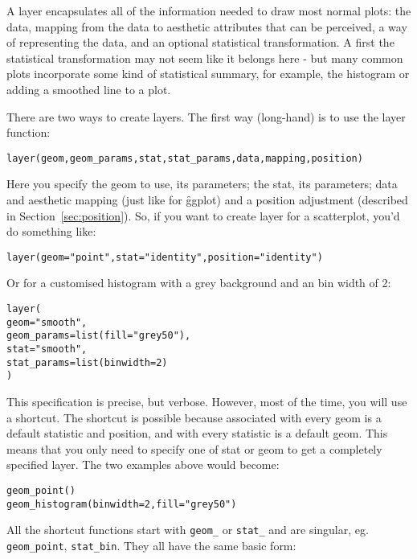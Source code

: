 A layer encapsulates all of the information needed to draw most normal plots:  the data, mapping from the data to aesthetic attributes that can be perceived, a way of representing the data, and an optional statistical transformation.  A first the statistical transformation may not seem like it belongs here - but many common plots incorporate some kind of statistical summary, for example, the histogram or adding a smoothed line to a plot.  

There are two ways to create layers.  The first way (long-hand) is to use the layer function:

\begin{alltt}
  layer(geom, geom_params, stat, stat_params, data, mapping, position)
\end{alltt}

\noindent Here you specify the geom to use, its parameters; the stat, its parameters; data and aesthetic mapping (just like for \f{ggplot}) and a position adjustment (described in Section~\ref{sec:position}).  So, if you want to create layer for a scatterplot, you'd do something like:

\begin{alltt}
layer(geom = "point", stat = "identity", position = "identity")  
\end{alltt}

\noindent Or for a customised histogram with a grey background and an bin width of 2:

\begin{alltt}
layer(
  geom = "smooth", 
  geom_params = list(fill = "grey50"),
  stat = "smooth",
  stat_params = list(binwidth = 2)
)
\end{alltt}

\noindent  This specification is precise, but verbose.  However, most of the time, you will use a shortcut.  The shortcut is possible because associated with every geom is a default statistic and position, and with every statistic is a default geom.  This means that you only need to specify one of stat or geom to get a completely specified layer.  The two examples above would become:

\begin{alltt}
geom_point()
geom_histogram(binwidth = 2, fill = "grey50")
\end{alltt}

All the shortcut functions start with {\tt geom\_} or {\tt stat\_} and are singular, eg. {\tt geom\_point}, {\tt stat\_bin}.  They all have the same  basic form:

